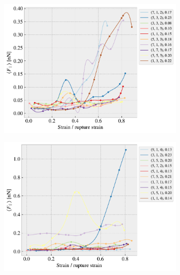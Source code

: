 \begin{figure}[H]
    \centering
    \begin{subfigure}[b]{0.49\textwidth}
        \centering
        \includegraphics[width=\textwidth]{figures/stretch_profiles/popup/SP_0_popup.pdf}
        \caption{}
    \end{subfigure}
    \hfill
    \begin{subfigure}[b]{0.49\textwidth}
        \centering
        \includegraphics[width=\textwidth]{figures/stretch_profiles/popup/SP_1_popup.pdf}
        \caption{}
    \end{subfigure}
    \hfill
    \begin{subfigure}[b]{0.49\textwidth}

\end{subfigure}
\end{figure}
